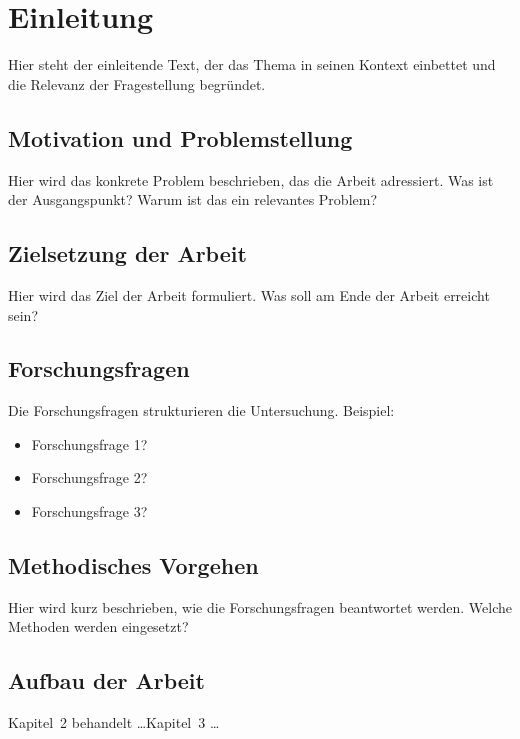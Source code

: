 
\chapter{Einleitung}
\label{chap:einleitung}

Hier steht der einleitende Text, der das Thema in seinen Kontext einbettet und
die Relevanz der Fragestellung begr\"{u}ndet.

\section{Motivation und Problemstellung}
\label{sec:motivation}

Hier wird das konkrete Problem beschrieben, das die Arbeit adressiert. Was ist
der Ausgangspunkt? Warum ist das ein relevantes Problem?

\section{Zielsetzung der Arbeit}
\label{sec:zielsetzung}

Hier wird das Ziel der Arbeit formuliert. Was soll am Ende der Arbeit
erreicht sein?

\section{Forschungsfragen}
\label{sec:forschungsfragen}

Die Forschungsfragen strukturieren die Untersuchung. Beispiel:

\begin{itemize}
  \item Forschungsfrage 1?
  \item Forschungsfrage 2?
  \item Forschungsfrage 3?
\end{itemize}

\section{Methodisches Vorgehen}
\label{sec:methodik}

Hier wird kurz beschrieben, wie die Forschungsfragen beantwortet werden.
Welche Methoden werden eingesetzt?

\section{Aufbau der Arbeit}
\label{sec:aufbau}

Kapitel~2 behandelt \ldots Kapitel~3 \ldots
